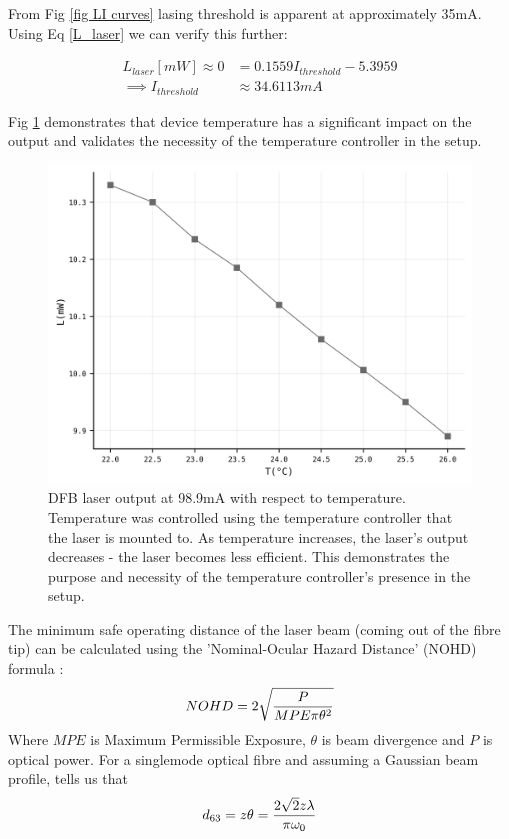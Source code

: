 \documentclass[12pt,a4paper]{report}
\begin{document}
From Fig \ref{fig LI curves} lasing threshold is apparent at approximately 35mA. Using Eq \ref{L_laser} we can verify this further:

\begin{align*}
    L_{laser} [mW] \approx 0 &= 0.1559 I_{threshold} - 5.3959 \\
    \implies I_{threshold} &\approx 34.6113 mA 
\end{align*}

Fig \ref{fig-temp-laser} demonstrates that device temperature has a significant impact on the output and validates the necessity of the temperature controller in the setup. 

\begin{figure}
\centering
\includegraphics[width=0.7\columnwidth]{LvsT10mWfinal_figure.png} 
\caption{DFB laser output at 98.9mA with respect to temperature. Temperature was controlled using the temperature controller that the laser is mounted to. As temperature increases, the laser's output decreases - the laser becomes less efficient. This demonstrates the purpose and necessity of the temperature controller's presence in the setup.}
\label{fig-temp-laser}
\end{figure}
\vspace{-0.5cm}
The minimum safe operating distance of the laser beam (coming out of the fibre tip) can be calculated using the 'Nominal-Ocular Hazard Distance' (NOHD) formula \cite{ucclaser}:
\begin{equation}
    NOHD=2\sqrt{\frac{P}{MPE\pi\theta^2}}
    \notag
\end{equation}
Where $MPE$ is Maximum Permissible Exposure, $\theta$ is beam divergence and $P$ is optical power. For a singlemode optical fibre and assuming a Gaussian beam profile, \cite{ucclaser} tells us that 
\begin{equation}
    d_{63}=z\theta=\frac{2\sqrt{2}z\lambda}{\pi\omega_{0}}
    \notag
\end{equation}
\end{document}
